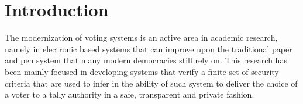 \documentclass[../access.tex]{subfiles}
\begin{document}
\section{Introduction}
\label{sec:introduction}
The modernization of voting systems is an active area in academic research, namely in electronic based systems that can improve upon the traditional paper and pen system that many modern democracies still rely on. This research has been mainly focused in developing systems that verify a finite set of security criteria that are used to infer in the ability of such system to deliver the choice of a voter to a tally authority in a safe, transparent and private fashion.
\par

\end{document}
